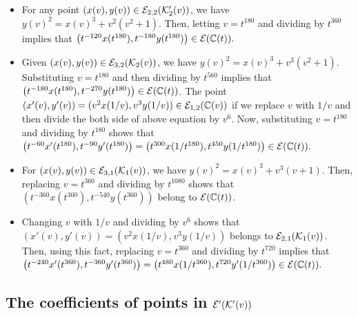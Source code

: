 \documentclass[11pt]{amsart}
\begin{document}
\begin{itemize}
	
	
	\item[(7)] For any point $(x(v), y(v)) \in {\mathcal E}_{2, 2} ({\mathcal K}'_2(v))$, we have 
	$ y(v)^2=x(v)^3+  v^2 (v^2+1)$.  Then,  letting $v=t^{180}$ and dividing  by $t^{360}$ implies that 
	$\left( t^{-120}  x(t^{180}),t^{-180}  y(t^{180})\right)  \in {\mathcal E} ({\mathbb C}(t)).$
	
	
	\item[(8)] Given $(x(v), y(v)) \in {\mathcal E}_{3, 2} ({\mathcal K}_2(v))$, we have  
	$ y(v)^2=x(v)^3+  v^3 (v^2+1)$. Substituting $v=t^{180}$ and 
	then dividing by $t^{560}$ implies that
	$\left( t^{-180} x(t^{180}), t^{-270} y(t^{180}) \right) \in {\mathcal E} ({\mathbb C}(t))$.
	The point  $ (x'(v), y'(v))=(v^2 x(1/v), v^3 y(1/v)) \in {\mathcal E}_{1, 2} ({\mathbb C}(v))$ if we replace $v$ with $1/v$ and then divide the both side of above equation by $v^6$.
	Now,  substituting $v=t^{180}$ and  dividing by $t^{180}$ shows that
	$ \left( t^{-60} x'(t^{180}) , t^{-90} y'(t^{180})\right) =
	\left(  t^{300}  x(1/t^{180}),t^{450}  y(1/t^{180}) \right)\in {\mathcal E} ({\mathbb C}(t)).$
	
	
	\item[(9)]  For $(x(v), y(v)) \in {\mathcal E}_{3, 1} ({\mathcal K}_1(v))$,  we have 
	$ y(v)^2=x(v)^3+  v^3 (v+1)$. Then, replacing $v=t^{360}$ and dividing by $t^{1080}$ shows that $\left(t^{-360} x(t^{360}) , t^{-540} y(t^{360}) \right)$
	belong to ${\mathcal E} ({\mathbb C}(t))$. 
	
	\item[(10)]
	Changing $v$ with $1/v$ and dividing by $v^6$ shows that
	$ (x'(v), y'(v))=(v^2 x(1/v), v^3 y(1/v))$ belongs to $ {\mathcal E}_{2, 1} ({\mathcal K}_1(v))$.
	Then, using this fact,  replacing $v=t^{360}$ and dividing by $t^{720}$ 
	implies that
	$	\left( t^{-240} x'(t^{360}), t^{-360} y'(t^{360}) \right)=
	\left( t^{480} x(1/t^{360}), t^{720 } y'(1/t^{360}) \right) \in {\mathcal E} ({\mathbb C}(t)).$
\end{itemize}

\fi

\iffalse

\subsection{The coefficients of points in ${\mathcal E}'({\mathcal K}'(v))$}
\label{K3C}
\end{document}
